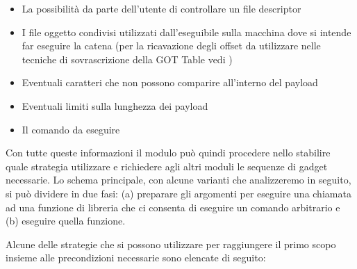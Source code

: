 \begin{itemize}
  \item La possibilità da parte dell'utente di controllare un file
    descriptor

  \item I file oggetto condivisi utilizzati dall'eseguibile sulla
    macchina dove si intende far eseguire la catena (per la
    ricavazione degli offset da utilizzare nelle tecniche di
    sovrascrizione della GOT Table vedi \rif{})

  \item Eventuali caratteri che non possono comparire all'interno del
    payload

  \item Eventuali limiti sulla lunghezza dei payload

  \item Il comando da eseguire

\end{itemize}

Con tutte queste informazioni il modulo può quindi procedere nello
stabilire quale strategia utilizzare e richiedere agli altri moduli le
sequenze di gadget necessarie. Lo schema principale, con alcune varianti
che analizzeremo in seguito, si può dividere in due fasi: (a)
preparare gli argomenti per eseguire una chiamata ad una funzione di
libreria che ci consenta di eseguire un comando arbitrario e (b)
eseguire quella funzione.

Alcune delle strategie che si possono utilizzare per raggiungere il
primo scopo insieme alle precondizioni necessarie sono elencate di
seguito:

